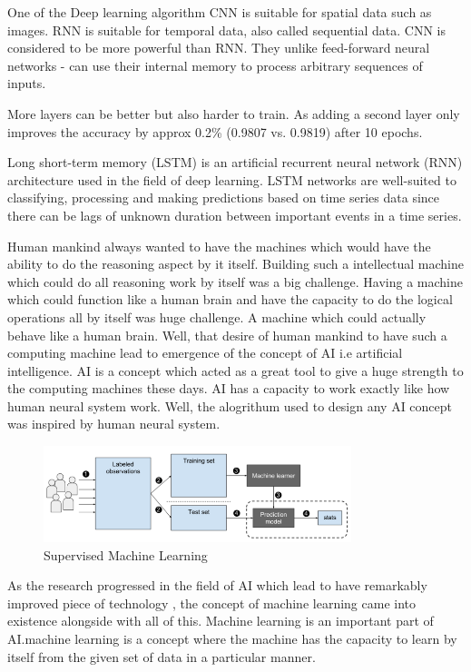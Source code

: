 One of the Deep learning algorithm CNN is suitable for spatial data such as images\cite{16}. RNN is suitable for temporal data, also called sequential data\cite{17}. CNN is considered to be more powerful than RNN. They unlike feed-forward neural networks - can use their internal memory to process arbitrary sequences of inputs.

More layers can be better but also harder to train. As adding a second layer only improves the accuracy by approx 0.2\% (0.9807 vs. 0.9819) after 10 epochs.

Long short-term memory (LSTM) is an artificial recurrent neural network (RNN) architecture used in the field of deep learning\cite{18}. LSTM networks are well-suited to classifying, processing and making predictions based on time series data since there can be lags of unknown duration between important events in a time series.

Human mankind always wanted to have the machines which would have the ability to do the reasoning aspect by it itself. Building such a intellectual machine which could do all reasoning work by itself was a big challenge. Having a machine which could function like a human brain and have the capacity to do the logical operations all by itself was huge challenge. A machine which could actually behave like a human brain. Well, that desire of human mankind to have such a computing machine lead to emergence of the concept of AI i.e artificial intelligence. AI is a concept which acted as a great tool to give a huge strength to the computing machines these days. AI has a capacity to work exactly like how human neural system work. Well, the alogrithum used to design any AI concept was inspired by human neural system.

\begin{figure}[ht]
	\centering
	\includegraphics[width=0.8\textwidth]{images/supervised-machine-learning.png}
	\caption{Supervised Machine Learning}
	\label{fig:supervised-machine-learning}
\end{figure}


As the research progressed in the field of AI which lead to have remarkably improved piece of technology , the concept of machine learning came into existence alongside with all of this. Machine learning is an important part of AI.machine learning is a concept where the machine has the capacity to learn by itself from the given set of data in a particular manner.

